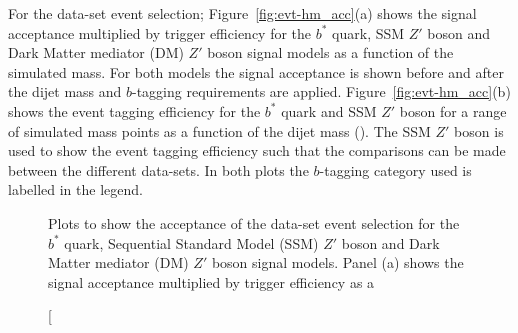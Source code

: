 For the \hm{} data-set event selection;
Figure~\ref{fig:evt-hm_acc}(a) shows the signal acceptance multiplied by trigger efficiency
for the $b^*$ quark, SSM $Z'$ boson and Dark Matter mediator (DM) $Z'$ boson signal models
as a function of the simulated mass.
For both models the signal acceptance is shown before and after the
dijet mass and $b$-tagging requirements are applied.
Figure~\ref{fig:evt-hm_acc}(b) shows the event tagging efficiency
for the $b^*$ quark and SSM $Z'$ boson for a range of simulated mass points
as a function of the dijet mass (\mjj{}).
The SSM $Z'$ boson is used to show the event tagging efficiency such that the
comparisons can be made between the different data-sets.
In both plots the $b$-tagging category used is labelled in the legend.

\begin{figure}[!ht]
  \begin{center}
    \captionsetup[subfigure]{aboveskip=0pt,justification=centering}
  \end{center}
  \caption[Plots to show the acceptance of the \hm{} data-set event selection for the $b^*$ quark,
            Sequential Standard Model (SSM) $Z'$ boson and Dark Matter mediator (DM) $Z'$ boson signal models.
            Panel (a) shows the signal acceptance multiplied by trigger efficiency as a

\end{figure}
